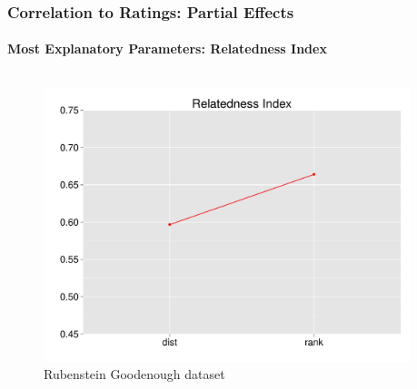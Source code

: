 \documentclass[t]{beamer} %
\begin{document}
\begin{frame}
\begin{columns}
\begin{column}{0.5\textwidth}
    \end{column}
  \end{columns}  
  
\end{frame}


\begin{frame}
  \frametitle{Correlation to Ratings: Partial Effects}
  \framesubtitle{Most Explanatory Parameters:  Relatedness Index} 
  
  \vspace{-18pt}
  
  \begin{columns}
    
    \begin{column}{0.5\textwidth}
      \begin{figure} 
        \hspace*{-18pt} 
        \includegraphics[scale=0.30]{img/lapesa_rg_main_relindex}
        \vspace{-10pt}
        \caption{Rubenstein Goodenough dataset}
      \end{figure}
    \end{column}


    \begin{column}{0.5\textwidth}
      \centering
      

\end{column}
\end{columns}
\end{frame}
\end{document}

